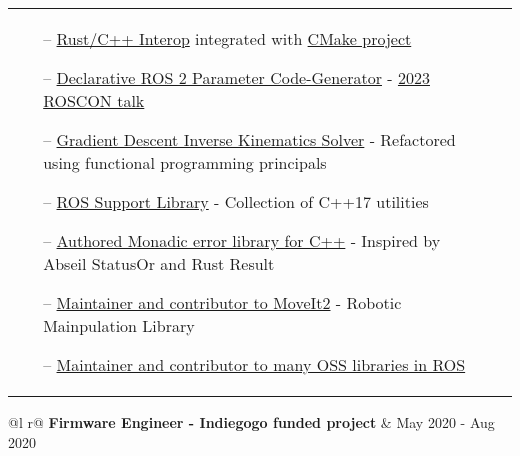 \documentclass[a4paper,12pt]{article}
\begin{document}
\begin{tabularx}{\linewidth}{ @{}l r@{} }
{\begin{minipage}[t]{\linewidth}
\begin{itemize}[nosep,after=\strut, leftmargin=1em, itemsep=3pt]
        \item[--] \href{https://tylerjw.dev/posts/rust-cpp-interop/}{Rust/C++ Interop} integrated with \href{https://tylerjw.dev/posts/rust-cmake-interop-cmake/}{CMake project}
        \item[--] \href{https://github.com/PickNikRobotics/generate_parameter_library}{Declarative ROS 2 Parameter Code-Generator} - \href{https://tylerjw.dev/posts/roscon23-parameters/}{2023 ROSCON talk}
        \item[--] \href{https://github.com/pickNikRobotics/pick_ik}{Gradient Descent Inverse Kinematics Solver} - Refactored using functional programming principals
        \item[--] \href{https://github.com/picknikrobotics/RSL}{ROS Support Library} - Collection of C++17 utilities
        \item[--] \href{https://www.fplib.dev/}{Authored Monadic error library for C++} - Inspired by Abseil StatusOr and Rust Result
        \item[--] \href{https://github.com/ros-planning/moveit2}{Maintainer and contributor to MoveIt2} - Robotic Mainpulation Library
        \item[--] \href{http://ros.rocks/?q=Tyler+Weaver}{Maintainer and contributor to many OSS libraries in ROS}
    \end{itemize}
    \end{minipage}}
\end{tabularx}

\begin{tabularx}{\linewidth}{ @{}l r@{} }
\textbf{Firmware Engineer - Indiegogo funded project} & \hfill May 2020 - Aug 2020 \\[3.75pt]
\end{tabularx}
\end{document}
